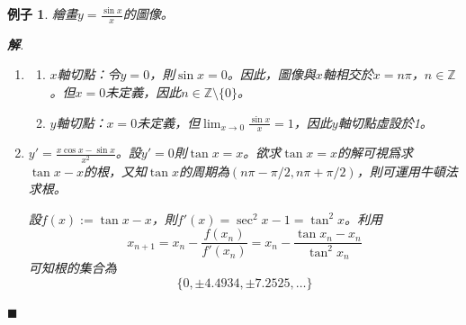 \documentclass[12pt]{article}
\newtheorem*{example}{例子}
\newenvironment*{sol}{\par \textbf{解}.}{\hfill$\blacksquare$}
\begin{document}
    \begin{example}
        繪畫$y=\displaystyle\frac{\sin{x}}{x}$的圖像。

        \begin{sol}
            \begin{enumerate}
                \item \begin{enumerate}
                    \item $x$軸切點：令$y=0$，則$\sin{x}=0$。因此，圖像與$x$軸相交於$x=n\pi$，$n\in\mathbb{Z}$。但$x=0$未定義，因此$n\in\mathbb{Z}\setminus\{0\}$。
                    \item $y$軸切點：$x=0$未定義，但$\displaystyle\lim_{x\to 0}\frac{\sin{x}}{x}=1$，因此$y$軸切點虛設於1。
                \end{enumerate}
                \item $y'=\displaystyle\frac{x\cos{x}-\sin{x}}{x^2}$。設$y'=0$則$\tan{x}=x$。欲求$\tan{x}=x$的解可視爲求$\tan{x}-x$的根，又知$\tan{x}$的周期為$(n\pi-\pi/2,n\pi+\pi/2)$，則可運用牛頓法求根。
                
                設$f(x):=\tan{x}-x$，則$f'(x)=\sec^2{x}-1=\tan^2{x}$。利用$$x_{n+1}=x_n-\frac{f(x_n)}{f'(x_n)}=x_n-\frac{\tan{x_n}-x_n}{\tan^2{x_n}}$$可知根的集合為$$\{0,\pm 4.4934, \pm 7.2525, \dots\}$$


\end{enumerate}
\end{sol}
\end{example}
\end{document}
